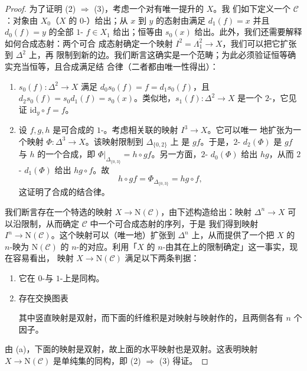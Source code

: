 \begin{proof}
为了证明 (2) $\Rightarrow$ (3)，考虑一个对\trSpine{}有唯一提升的\trSimplicialSet{} $X$。我
们如下定义一个\trCategory{} $\mathcal{C}$：对象由 $X_0$（$X$ 的 $0$-\trSimplex{}）给出；从
$x$ 到 $y$ 的态射由满足 $d_1(f) = x$ 并且 $d_0(f) = y$ 的全部 $1$-\trSimplex{}%
$f \in X_1$ 给出；恒等由 $s_0(x)$ 给出。此外，我们还需要解释如何合成态射：两个可合
成态射确定一个映射 $I^2 = \Lambda^2_1 \to X$，我们可以把它扩张到 $\Delta^2$ 上，再
限制到新的边。我们断言这确实是一个范畴；为此必须验证恒等确实充当恒等，且合成满足结
合律（二者都由唯一性得出）：
\begin{enumerate}[label=(\alph*)]
  \item $s_0(f)\colon \Delta^2 \to X$ 满足 $d_0 s_0(f) = f = d_1 s_0(f)$，且
  $d_2 s_0(f) = s_0 d_1(f) = s_0(x)$。类似地，$s_1(f)\colon \Delta^2 \to X$ 是一个
  $2$-\trSimplex{}，它见证 $\mathrm{id}_y \circ f = f$。
  \item 设 $f, g, h$ 是可合成的 $1$-\trSimplex{}。考虑相关联的映射 $I^3 \to X$。它可以唯一
  地扩张为一个映射 $\Phi\colon \Delta^3 \to X$。该映射限制到 $\Delta_{\{0,2\}}$ 上
  是 $gf$。于是，$2$-\trSimplex{} $d_2(\Phi)$ 是 $gf$ 与 $h$ 的一个合成，即
  $\Phi|_{\Delta_{\{0,3\}}} = h \circ gf$。另一方面，$2$-\trSimplex{} $d_0(\Phi)$ 给出
  $hg$，从而 $2$-\trSimplex{} $d_1(\Phi)$ 给出 $hg \circ f$。故
\[
h \circ gf = \Phi_{\Delta_{\{0,3\}}} = hg \circ f,
\]
  这证明了合成的结合律。
\end{enumerate}
我们断言存在一个特选的映射 $X \to \mathrm{N}(\mathcal{C})$，由下述构造给出：映射
$\Delta^n \to X$ 可以沿\trSpine{}限制，从而确定 $\mathcal{C}$ 中一个可合成态射的序列，于是
我们得到映射 $I^n \to \mathrm{N}(\mathcal{C})$。这个映射可以（唯一地）扩张到
$\Delta^n$ 上，从而提供了一个把 $X$ 的 $n$-\trSimplex{}映为 $\mathrm{N}(\mathcal{C})$ 的
$n$-\trSimplex{}的对应。利用「$X$ 的 $n$-\trSimplex{}由其在\trSpine{}上的限制确定」这一事实，现在容易看出，
映射 $X \to \mathrm{N}(\mathcal{C})$ 满足以下两条判据：
\begin{enumerate}[label=(\alph*)]
  \item 它在 $0$-\trSimplex{}与 $1$-\trSimplex{}上是同构。
  \item 存在交换图表
\begin{center}
\end{center}
  其中竖直映射是双射，而下面的纤维积是对\trSource{}映射与\trTarget{}映射作的，且两侧各有 $n$ 个因子。
\end{enumerate}
由 (a)，下面的映射是双射，故上面的水平映射也是双射。这表明映射 $X \to \mathrm{N}(\mathcal{C})$
是单纯集的同构，即 (2) $\Rightarrow$ (3) 得证。


\end{proof}
